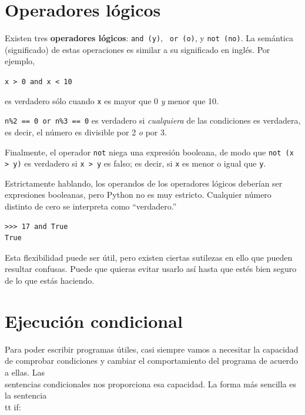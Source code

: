 

\section {Operadores lógicos}

Existen tres {\bf operadores lógicos}: {\tt and (y)}, {\tt
or (o)}, y {\tt not (no)}. La semántica (significado) de estas operaciones
es similar a su significado en inglés. Por ejemplo, 

{\tt x > 0 and x < 10} 

es verdadero sólo cuando {\tt x} es mayor que 0
\emph{y} menor que 10.


{\tt n\%2 == 0 or n\%3 == 0} es verdadero si \emph{cualquiera} de las condiciones
es verdadera, es decir, el número es divisible por 2 \emph{o} por 3.

Finalmente, el operador {\tt not} niega una expresión
booleana, de modo que {\tt not (x > y)} es verdadero si {\tt x > y} es falso;
es decir, si {\tt x} es menor o igual que {\tt y}.

Estrictamente hablando, los operandos de los operadores lógicos deberían ser
expresiones booleanas, pero Python no es muy estricto.
Cualquier número distinto de cero se interpreta como ``verdadero.''

\beforeverb
\begin{verbatim}
>>> 17 and True
True
\end{verbatim}
\afterverb
%
Esta flexibilidad puede ser útil, pero existen ciertas sutilezas en
ello que pueden resultar confusas. Puede que quieras evitar usarlo así
hasta que estés bien seguro de lo que estás haciendo.

\section{Ejecución condicional}
\label{conditional execution}


Para poder escribir programas útiles, casi siempre vamos a necesitar
la capacidad de comprobar condiciones y cambiar el comportamiento del programa
de acuerdo a ellas. Las {\\ sentencias condicionales} nos proporciona esa capacidad.
La forma más sencilla es la sentencia {\\tt if}:


